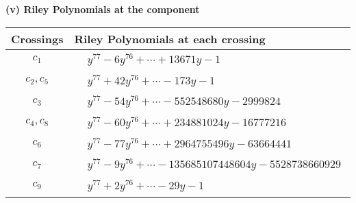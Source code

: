 \documentclass[1p]{elsarticle_modified}
\theoremstyle{definition}
\begin{document}
\newpage\renewcommand{\arraystretch}{1}
\flushleft \textbf{(v) Riley Polynomials at the component}\newline \\
\begin{tabular}{m{50pt}|m{274pt}}
Crossings & \hspace{64pt}Riley Polynomials at each crossing \\
\hline $$\begin{aligned}c_{1}\end{aligned}$$&$\begin{aligned}
&y^{77}-6 y^{76}+\cdots+13671 y-1
\end{aligned}$\\
\hline $$\begin{aligned}c_{2},c_{5}\end{aligned}$$&$\begin{aligned}
&y^{77}+42 y^{76}+\cdots-173 y-1
\end{aligned}$\\
\hline $$\begin{aligned}c_{3}\end{aligned}$$&$\begin{aligned}
&y^{77}-54 y^{76}+\cdots-552548680 y-2999824
\end{aligned}$\\
\hline $$\begin{aligned}c_{4},c_{8}\end{aligned}$$&$\begin{aligned}
&y^{77}-60 y^{76}+\cdots+234881024 y-16777216
\end{aligned}$\\
\hline $$\begin{aligned}c_{6}\end{aligned}$$&$\begin{aligned}
&y^{77}-77 y^{76}+\cdots+2964755496 y-63664441
\end{aligned}$\\
\hline $$\begin{aligned}c_{7}\end{aligned}$$&$\begin{aligned}
&y^{77}-9 y^{76}+\cdots-135685107448604 y-5528738660929
\end{aligned}$\\
\hline $$\begin{aligned}c_{9}\end{aligned}$$&$\begin{aligned}
&y^{77}+2 y^{76}+\cdots-29 y-1
\end{aligned}$\\

\end{tabular}
\end{document}
